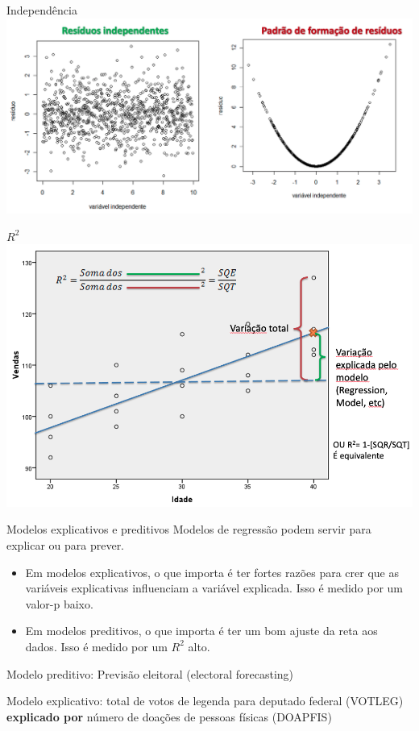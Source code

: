 \documentclass[
  9pt,
  ignorenonframetext,
  aspectratio=169]{beamer}
\begin{document}
\begin{frame}{Independência}
\protect\hypertarget{independuxeancia}{}
\includegraphics{imgs/indep.png}
\end{frame}

\begin{frame}{\(R^2\)}
\protect\hypertarget{r2}{}
\includegraphics{imgs/r2_explica.png}
\end{frame}

\begin{frame}{Modelos explicativos e preditivos}
\protect\hypertarget{modelos-explicativos-e-preditivos}{}
Modelos de regressão podem servir para explicar ou para prever.

\begin{itemize}
\item
  Em modelos explicativos, o que importa é ter fortes razões para crer
  que as variáveis explicativas influenciam a variável explicada. Isso é
  medido por um valor-p baixo.
\item
  Em modelos preditivos, o que importa é ter um bom ajuste da reta aos
  dados. Isso é medido por um \(R^2\) alto.
\end{itemize}

Modelo preditivo: Previsão eleitoral (electoral forecasting)

Modelo explicativo: total de votos de legenda para deputado federal
(VOTLEG) \textbf{explicado por} número de doações de pessoas físicas
(DOAPFIS)
\end{frame}
\end{document}
